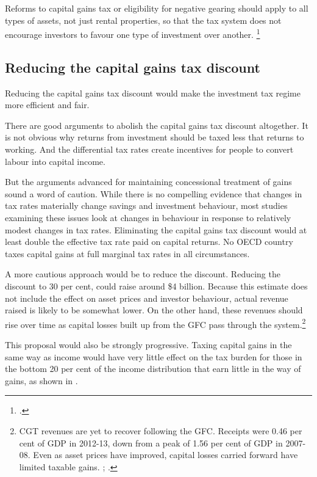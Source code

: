 \documentclass{grattan}\usepackage[]{graphicx}\usepackage[]{color}
\begin{document}
Reforms to capital gains tax or eligibility for negative gearing should apply to all types of assets, not just rental properties, so that the tax system does not encourage investors to favour one type of investment over another.  \footcite[p.~133]{Commission2004}

\subsection{Reducing the capital gains tax discount}
Reducing the capital gains tax discount would make the investment tax regime more efficient and fair. 

There are good arguments to abolish the capital gains tax discount altogether. It is not obvious why returns from investment should be taxed less that returns to working. And the differential tax rates create incentives for people to convert labour into capital income. 

But the arguments advanced for maintaining concessional treatment of gains sound a word of caution. While there is no compelling evidence that changes in tax rates materially change savings and investment behaviour, most studies examining these issues look at changes in behaviour in response to relatively modest changes in tax rates. Eliminating the capital gains tax discount would at least double the effective tax rate paid on capital returns. No OECD country taxes capital gains at full marginal tax rates in all circumstances. 

A more cautious approach would be to reduce the discount. Reducing the discount to 30 per cent, could raise around \$4 billion. Because this estimate does not include the effect on asset prices and investor behaviour, actual revenue raised is likely to be somewhat lower. On the other hand, these revenues should rise over time as capital losses built up from the GFC pass through the system.\footnote{CGT revenues are yet to recover following the GFC. Receipts were 0.46 per cent of GDP in 2012-13, down from a peak of 1.56 per cent of GDP in 2007-08. Even as asset prices have improved, capital losses carried forward have limited taxable gains. \textcite{Stewart2015}; \textcite{PBO2014}. }

This proposal would also be strongly progressive. Taxing capital gains in the same way as income would have very little effect on the tax burden for those in the bottom 20 per cent of the income distribution that earn little in the way of gains, as shown in . 
\end{document}
